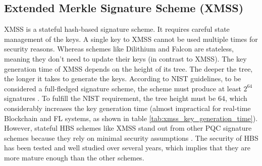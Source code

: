 \subsection{Extended Merkle Signature Scheme (XMSS)}
XMSS is a stateful hash-based signature scheme.
It requires careful state management of the keys.
A single key to XMSS cannot be used multiple times for security reasons. 
Whereas schemes like Dilithium and Falcon are stateless, meaning
they don't need to update their keys (in contrast to XMSS).
The key generation time of XMSS depends on the height of its tree.
The deeper the tree, the longer it takes to generate the keys.
According to NIST guidelines,
to be considered a full-fledged signature scheme, the scheme must produce at least $2^{64}$ signatures \cite{europeanunionagencyforcybersecurity.PostquantumCryptographyCurrent2021}.
To fulfill the NIST requirement, 
the tree height must be $64$, which considerably increases the key generation time
(almost impractical for real-time Blockchain and FL systems, 
as shown in table \ref{tab:xmss_key_generation_time}). 
However,  stateful HBS schemes like XMSS stand out from other PQC signature schemes because they rely on minimal security assumptions \cite{buchmann2011xmss}.
The security of HBS has been tested and well studied over several years, 
which implies that they are more mature enough than the other schemes.
\begin{table}[]
    \centering
    \caption{XMSS key generation time and the number of keys available based on different tree heights.}
    \label{tab:xmss_key_generation_time}
\end{table}
